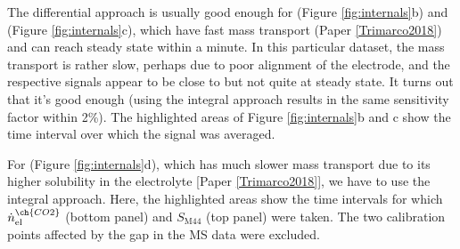 The differential approach is usually good enough for  (Figure \ref{fig:internals}b) and  (Figure \ref{fig:internals}c), which have fast mass transport (Paper \ref{Trimarco2018}) and can reach steady state within a minute. In this particular dataset, the mass transport is rather slow, perhaps due to poor alignment of the electrode, and the respective signals appear to be close to but not quite at steady state. It turns out that it's good enough (using the integral approach results in the same sensitivity factor within 2\%). The highlighted areas of Figure \ref{fig:internals}b and c show the time interval over which the signal was averaged.

For  (Figure \ref{fig:internals}d), which has much slower mass transport due to its higher solubility in the electrolyte [Paper \ref{Trimarco2018}], we have to use the integral approach. Here, the highlighted areas show the time intervals for which $\dot{n}^{\ch{CO2}}_\text{el}$ (bottom panel) and $S_\text{M44}$ (top panel) were taken. The two calibration points affected by the gap in the MS data were excluded.

